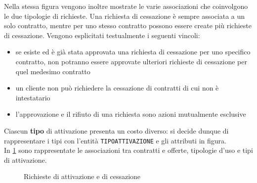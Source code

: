 \documentclass[a4paper,12pt]{report}
\begin{document}
Nella stessa figura vengono inoltre mostrate le varie associazioni che coinvolgono le due tipologie di richieste. Una richiesta di cessazione è sempre associata a un solo contratto, mentre per uno stesso contratto possono essere create più richieste di cessazione.
\newline
Vengono esplicitati testualmente i seguenti vincoli:
\begin{itemize}
    \item se esiste ed è già stata approvata una richiesta di cessazione per uno specifico contratto, non potranno essere approvate ulteriori richieste di cessazione per quel medesimo contratto
    \item un cliente non può richiedere la cessazione di contratti di cui non è intestatario
    \item l'approvazione e il rifiuto di una richiesta sono azioni mutualmente esclusive
\end{itemize}
Ciascun \textbf{tipo} di attivazione presenta un costo diverso: si decide dunque di rappresentare i tipi con l'entità \texttt{TIPO\textunderscore ATTIVAZIONE} e gli attributi in figura.\\[10pt]
In \cref{fig:requests-activation} sono rappresentate le associazioni tra contratti e offerte, tipologie d'uso e tipi di attivazione.

\begin{figure}[H]
\centering{}
\caption{Richieste di attivazione e di cessazione}
\label{fig:requests-activation}
\end{figure}
\end{document}
